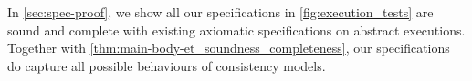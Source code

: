 \begin{theorem}[Compositionality]
In \cref{sec:spec-proof}, we show all our specifications in \cref{fig:execution_tests} 
are sound and complete with existing axiomatic specifications on abstract executions.
Together with \cref{thm:main-body-et_soundness_completeness}, 
our specifications do capture all possible behaviours of consistency models.


 



\end{theorem}
